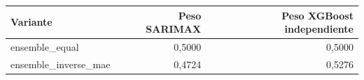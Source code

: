 \begin{tabular}{lrr}
\toprule
\rowcolor{naranja}
\textbf{Variante} & \textbf{Peso SARIMAX} & \textbf{Peso XGBoost independiente} \\
\midrule
\rowcolor{filaclara} ensemble\_\allowbreak{}equal & 0,5000 & 0,5000 \\
ensemble\_\allowbreak{}inverse\_\allowbreak{}mae & 0,4724 & 0,5276 \\
\bottomrule
\end{tabular}

